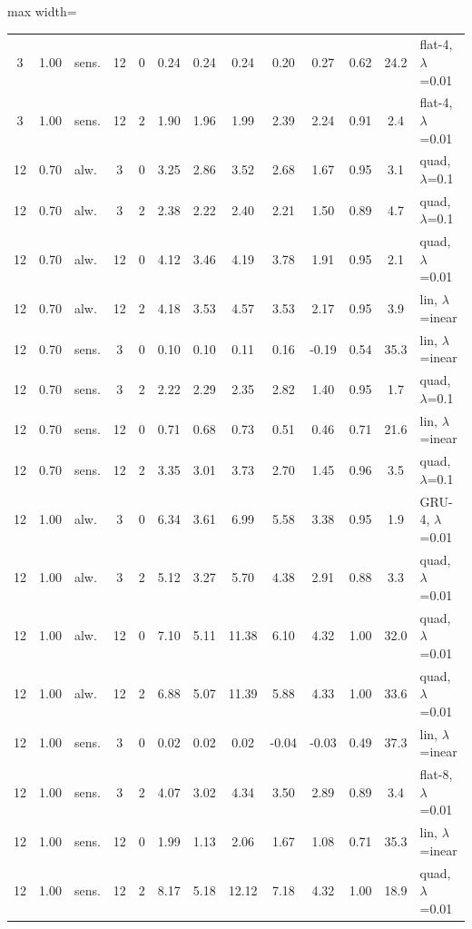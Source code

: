 \documentclass[10pt]{article}
\begin{document}
\begin{table}[htbp]
\begin{adjustbox}{max width=\textwidth}
\begin{tabular}{cclcc cccc c cc l}
3 & 1.00 & sens. & 12 & 0 & 0.24 & 0.24 & 0.24 & 0.20 & 0.27 & 0.62 & 24.2 & flat-4, $\lambda$=0.01 \\
3 & 1.00 & sens. & 12 & 2 & 1.90 & 1.96 & 1.99 & 2.39 & 2.24 & 0.91 & 2.4 & flat-4, $\lambda$=0.01 \\
12 & 0.70 & alw. & 3 & 0 & 3.25 & 2.86 & 3.52 & 2.68 & 1.67 & 0.95 & 3.1 & quad, $\lambda$=0.1 \\
12 & 0.70 & alw. & 3 & 2 & 2.38 & 2.22 & 2.40 & 2.21 & 1.50 & 0.89 & 4.7 & quad, $\lambda$=0.1 \\
12 & 0.70 & alw. & 12 & 0 & 4.12 & 3.46 & 4.19 & 3.78 & 1.91 & 0.95 & 2.1 & quad, $\lambda$=0.01 \\
12 & 0.70 & alw. & 12 & 2 & 4.18 & 3.53 & 4.57 & 3.53 & 2.17 & 0.95 & 3.9 & lin, $\lambda$=inear \\
12 & 0.70 & sens. & 3 & 0 & 0.10 & 0.10 & 0.11 & 0.16 & -0.19 & 0.54 & 35.3 & lin, $\lambda$=inear \\
12 & 0.70 & sens. & 3 & 2 & 2.22 & 2.29 & 2.35 & 2.82 & 1.40 & 0.95 & 1.7 & quad, $\lambda$=0.1 \\
12 & 0.70 & sens. & 12 & 0 & 0.71 & 0.68 & 0.73 & 0.51 & 0.46 & 0.71 & 21.6 & lin, $\lambda$=inear \\
12 & 0.70 & sens. & 12 & 2 & 3.35 & 3.01 & 3.73 & 2.70 & 1.45 & 0.96 & 3.5 & quad, $\lambda$=0.1 \\
12 & 1.00 & alw. & 3 & 0 & 6.34 & 3.61 & 6.99 & 5.58 & 3.38 & 0.95 & 1.9 & GRU-4, $\lambda$=0.01 \\
12 & 1.00 & alw. & 3 & 2 & 5.12 & 3.27 & 5.70 & 4.38 & 2.91 & 0.88 & 3.3 & quad, $\lambda$=0.01 \\
12 & 1.00 & alw. & 12 & 0 & 7.10 & 5.11 & 11.38 & 6.10 & 4.32 & 1.00 & 32.0 & quad, $\lambda$=0.01 \\
12 & 1.00 & alw. & 12 & 2 & 6.88 & 5.07 & 11.39 & 5.88 & 4.33 & 1.00 & 33.6 & quad, $\lambda$=0.01 \\
12 & 1.00 & sens. & 3 & 0 & 0.02 & 0.02 & 0.02 & -0.04 & -0.03 & 0.49 & 37.3 & lin, $\lambda$=inear \\
12 & 1.00 & sens. & 3 & 2 & 4.07 & 3.02 & 4.34 & 3.50 & 2.89 & 0.89 & 3.4 & flat-8, $\lambda$=0.01 \\
12 & 1.00 & sens. & 12 & 0 & 1.99 & 1.13 & 2.06 & 1.67 & 1.08 & 0.71 & 35.3 & lin, $\lambda$=inear \\
12 & 1.00 & sens. & 12 & 2 & 8.17 & 5.18 & 12.12 & 7.18 & 4.32 & 1.00 & 18.9 & quad, $\lambda$=0.01 \\
\bottomrule
\end{tabular}
\end{adjustbox}
\end{table}
\end{document}
